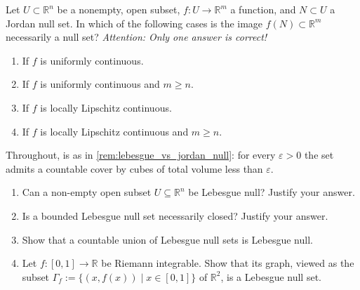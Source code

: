 
\begin{exercise}
\label{ex:jordan_null_image_lipschitz_choice}
Let $U \subset \mathbb{R}^n$ be a nonempty, open subset, $f : U \to \mathbb{R}^m$ a function,
and $N \subset U$ a Jordan null set. In which of the following cases is the image
$f(N) \subset \mathbb{R}^m$ necessarily a null set? \textit{Attention: Only one answer is
correct!}
\begin{enumerate}[label=\textbf{(\alph*)}]
  \item If $f$ is uniformly continuous.
  \item If $f$ is uniformly continuous and $m \geq n$.
  \item If $f$ is locally Lipschitz continuous.
  \item If $f$ is locally Lipschitz continuous and $m \geq n$.
\end{enumerate}
\end{exercise}

\begin{exercise}
\label{ex:lebesgue_null_sets_properties}
Throughout,  is as in \cref{rem:lebesgue_vs_jordan_null}: for every
$\varepsilon > 0$ the set admits a countable cover by cubes of total volume less than $\varepsilon$.
\begin{enumerate}[label=\textbf{(\alph*)}]
  \item Can a non-empty open subset $U \subseteq \mathbb{R}^n$ be Lebesgue null? Justify your
    answer.
  \item Is a bounded Lebesgue null set necessarily closed? Justify your answer.
  \item Show that a countable union of Lebesgue null sets is Lebesgue null.
  \item Let $f : [0,1] \to \mathbb{R}$ be Riemann integrable. Show that its graph, viewed as the
    subset $\Gamma_f := \{(x,f(x)) \mid x \in [0,1]\}$ of $\mathbb{R}^2$, is a Lebesgue null set.
\end{enumerate}
\end{exercise}

